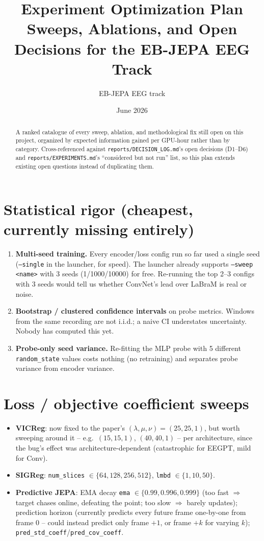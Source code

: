 \documentclass[10pt,a4paper]{article}
\title{\textbf{Experiment Optimization Plan}\\
  \large Sweeps, Ablations, and Open Decisions for the EB-JEPA EEG Track}
\author{EB-JEPA EEG track}
\date{June 2026}
\begin{document}
\maketitle

\begin{abstract}
A ranked catalogue of every sweep, ablation, and methodological fix still open on
this project, organized by expected information gained per GPU-hour rather than by
category. Cross-referenced against \texttt{reports/DECISION\_LOG.md}'s open decisions
(D1--D6) and \texttt{reports/EXPERIMENTS.md}'s ``considered but not run'' list, so
this plan extends existing open questions instead of duplicating them.
\end{abstract}

\section{Statistical rigor (cheapest, currently missing entirely)}
\begin{enumerate}
  \item \textbf{Multi-seed training.} Every encoder/loss config run so far used a
  single seed (\texttt{--single} in the launcher, for speed). The launcher already
  supports \texttt{--sweep <name>} with 3 seeds (1/1000/10000) for free. Re-running the
  top 2--3 configs with 3 seeds would tell us whether ConvNet's lead over LaBraM is
  real or noise.
  \item \textbf{Bootstrap / clustered confidence intervals} on probe metrics. Windows
  from the same recording are not i.i.d.; a naive CI understates uncertainty. Nobody
  has computed this yet.
  \item \textbf{Probe-only seed variance.} Re-fitting the MLP probe with 5 different
  \texttt{random\_state} values costs nothing (no retraining) and separates probe
  variance from encoder variance.
\end{enumerate}

\section{Loss / objective coefficient sweeps}
\begin{itemize}
  \item \textbf{VICReg}: now fixed to the paper's $(\lambda,\mu,\nu)=(25,25,1)$, but
  worth sweeping around it -- e.g.\ $(15,15,1)$, $(40,40,1)$ -- per architecture,
  since the bug's effect was architecture-dependent (catastrophic for EEGPT, mild for
  Conv).
  \item \textbf{SIGReg}: \texttt{num\_slices} $\in \{64,128,256,512\}$,
  \texttt{lmbd} $\in \{1,10,50\}$.
  \item \textbf{Predictive JEPA}: EMA decay \texttt{ema} $\in \{0.99, 0.996, 0.999\}$
  (too fast $\Rightarrow$ target chases online, defeating the point; too slow
  $\Rightarrow$ barely updates); prediction horizon (currently predicts every future
  frame one-by-one from frame 0 -- could instead predict only frame $+1$, or frame
  $+k$ for varying $k$); \texttt{pred\_std\_coeff}/\texttt{pred\_cov\_coeff}.
\end{itemize}
\end{document}
